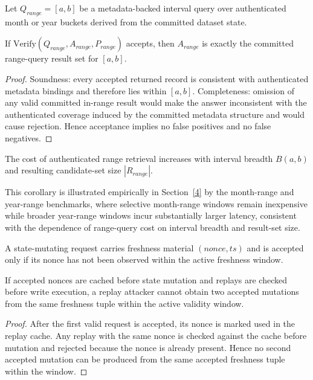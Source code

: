 \begin{definition}
Let $Q_{range}=[a,b]$ be a metadata-backed interval query over authenticated month or year buckets derived from the committed dataset state.
\end{definition}

\begin{theorem}
\label{thm:range_correct}
If $\mathrm{Verify}(Q_{range},A_{range},P_{range})$ accepts, then $A_{range}$ is exactly the committed range-query result set for $[a,b]$.
\end{theorem}
\begin{proof}
Soundness: every accepted returned record is consistent with authenticated metadata bindings and therefore lies within $[a,b]$. Completeness: omission of any valid committed in-range result would make the answer inconsistent with the authenticated coverage induced by the committed metadata structure and would cause rejection. Hence acceptance implies no false positives and no false negatives.
\end{proof}

\begin{corollary}
The cost of authenticated range retrieval increases with interval breadth $B(a,b)$ and resulting candidate-set size $|R_{range}|$.
\end{corollary}
This corollary is illustrated empirically in Section~\ref{4} by the month-range and year-range benchmarks, where selective month-range windows remain inexpensive while broader year-range windows incur substantially larger latency, consistent with the dependence of range-query cost on interval breadth and result-set size.

\begin{definition}
A state-mutating request carries freshness material $(nonce, ts)$ and is accepted only if its nonce has not been observed within the active freshness window.
\end{definition}

\begin{theorem}
\label{thm:replay}
If accepted nonces are cached before state mutation and replays are checked before write execution, a replay attacker cannot obtain two accepted mutations from the same freshness tuple within the active validity window.
\end{theorem}
\begin{proof}
After the first valid request is accepted, its nonce is marked used in the replay cache. Any replay with the same nonce is checked against the cache before mutation and rejected because the nonce is already present. Hence no second accepted mutation can be produced from the same accepted freshness tuple within the window.
\end{proof}

